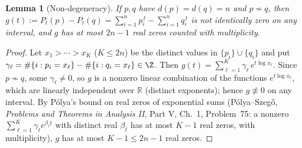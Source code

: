\documentclass{amsart}
\theoremstyle{plain}
\newtheorem{lemma}{Lemma}
\theoremstyle{definition}
\newcommand{\R}{\mathbb{R}}
\begin{document}
\begin{lemma}[Non-degeneracy]\label{lem:notid}
If $p,q$ have $d(p)=d(q)=n$ and $p\not\sim q$, then
$g(t):=P_t(p)-P_t(q)=\sum_{i=1}^n p_i^{\,t}-\sum_{i=1}^n q_i^{\,t}$ is not identically
zero on any interval, and $g$ has at most $2n-1$ real zeros counted with multiplicity.
\end{lemma}
\begin{proof}
Let $x_1>\cdots>x_K$ ($K\le2n$) be the distinct values in $\{p_i\}\cup\{q_i\}$ and put
$\gamma_\ell=\#\{i:p_i=x_\ell\}-\#\{i:q_i=x_\ell\}\in\Z$. Then
$g(t)=\sum_{\ell=1}^K\gamma_\ell\,e^{t\log x_\ell}$. Since $p\not\sim q$, some
$\gamma_\ell\ne0$, so $g$ is a nonzero linear combination of the functions
$e^{t\log x_\ell}$, which are linearly independent over $\R$ (distinct exponents);
hence $g\not\equiv0$ on any interval. By P\'olya's bound on real zeros of exponential
sums (P\'olya--Szeg\H{o}, \emph{Problems and Theorems in Analysis II}, Part V, Ch.~1,
Problem~75: a nonzero $\sum_{\ell=1}^K\gamma_\ell e^{\beta_\ell t}$ with distinct real
$\beta_\ell$ has at most $K-1$ real zeros, with multiplicity), $g$ has at most
$K-1\le2n-1$ real zeros.
\end{proof}
\end{document}
